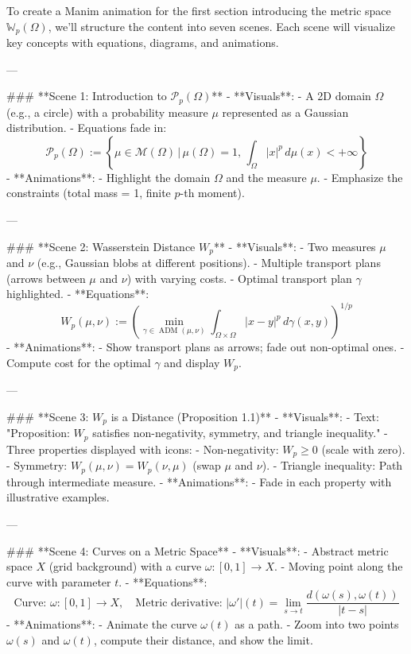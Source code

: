 To create a Manim animation for the first section introducing the metric space \(\mathbb{W}_{p}(\Omega)\), we'll structure the content into seven scenes. Each scene will visualize key concepts with equations, diagrams, and animations.

---

### **Scene 1: Introduction to \(\mathcal{P}_{p}(\Omega)\)**
- **Visuals**:
  - A 2D domain \(\Omega\) (e.g., a circle) with a probability measure \(\mu\) represented as a Gaussian distribution.
  - Equations fade in:
    \[
    \mathcal{P}_{p}(\Omega) := \left\{\mu \in \mathcal{M}(\Omega) \,\bigg|\, \mu(\Omega)=1, \, \int_{\Omega}|x|^p \, d\mu(x) < +\infty \right\}
    \]
- **Animations**:
  - Highlight the domain \(\Omega\) and the measure \(\mu\).
  - Emphasize the constraints (total mass = 1, finite \(p\)-th moment).

---

### **Scene 2: Wasserstein Distance \(W_p\)**
- **Visuals**:
  - Two measures \(\mu\) and \(\nu\) (e.g., Gaussian blobs at different positions).
  - Multiple transport plans (arrows between \(\mu\) and \(\nu\)) with varying costs.
  - Optimal transport plan \(\gamma\) highlighted.
- **Equations**:
  \[
  W_p(\mu, \nu) := \left(\min_{\gamma \in \operatorname{ADM}(\mu, \nu)} \int_{\Omega \times \Omega} |x-y|^p \, d\gamma(x,y)\right)^{1/p}
  \]
- **Animations**:
  - Show transport plans as arrows; fade out non-optimal ones.
  - Compute cost for the optimal \(\gamma\) and display \(W_p\).

---

### **Scene 3: \(W_p\) is a Distance (Proposition 1.1)**
- **Visuals**:
  - Text: "Proposition: \(W_p\) satisfies non-negativity, symmetry, and triangle inequality."
  - Three properties displayed with icons:
    - Non-negativity: \(W_p \geq 0\) (scale with zero).
    - Symmetry: \(W_p(\mu, \nu) = W_p(\nu, \mu)\) (swap \(\mu\) and \(\nu\)).
    - Triangle inequality: Path through intermediate measure.
- **Animations**:
  - Fade in each property with illustrative examples.

---

### **Scene 4: Curves on a Metric Space**
- **Visuals**:
  - Abstract metric space \(X\) (grid background) with a curve \(\omega: [0,1] \to X\).
  - Moving point along the curve with parameter \(t\).
- **Equations**:
  \[
  \text{Curve: } \omega: [0,1] \to X, \quad \text{Metric derivative: } |\omega'|(t) = \lim_{s \to t} \frac{d(\omega(s), \omega(t))}{|t-s|}
  \]
- **Animations**:
  - Animate the curve \(\omega(t)\) as a path.
  - Zoom into two points \(\omega(s)\) and \(\omega(t)\), compute their distance, and show the limit.

